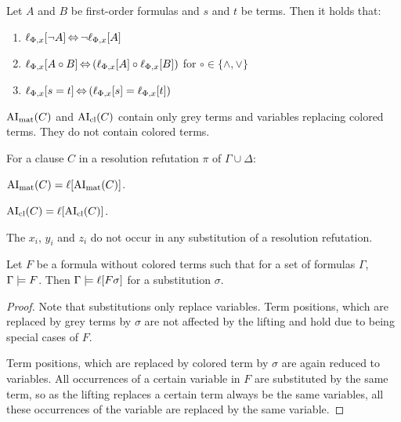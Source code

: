 \documentclass[,%
	paper=a4,%
	DIV15, 
	liststotoc,
	bibtotoc,
	draft=false,%
	numbers=noendperiod
]{scrartcl}
\begin{document}
\begin{lemma}
	\label{lemma:lift_logic_commute}
	Let $A$ and $B$ be first-order formulas and $s$ and $t$ be terms. Then it holds that:
	\begin{enumerate}
		\item $\lift{\Phi}{\lnot A}{x} \semiff{} \lnot \lift{\Phi}{A}{x}$
		\item $\lift{\Phi}{A \circ B}{x} \semiff{} ( \lift{\Phi}{A}{x} \circ \lift{\Phi}{B}{x} )$ for  $\circ \in     \{\land, \lor\}$
		\item $\lift{\Phi}{s = t}{x} \semiff{} ( \lift{\Phi}{s}{x} = \lift{\Phi}{t}{x} )$
	\end{enumerate}
\end{lemma}



\begin{lemma}
	$\AImatrix(C)$ and $\AIclause(C)$ contain only grey terms and variables replacing colored terms. They do not contain colored terms.
	\label{lemma:no_colored_terms}
\end{lemma}



\begin{corr}
  For a clause $C$ in a resolution refutation $\pi$ of $\Gamma \cup \Delta$:
  \begin{compactenum}
    \item $\AImatrix(C) = \lifboth{\AImatrix(C)}$.

    \item $\AIclause(C) = \lifboth{\AIclause(C)}$.
  \end{compactenum}
  \label{corr:lift_ai}
\end{corr}

\begin{lemma}
  The $x_i$, $y_i$ and $z_i$ do not occur in any substitution of a resolution refutation.
\end{lemma}

\begin{lemma}
	Let $F$ be a formula without colored terms such that for a set of formulas $\Gamma$, $\Gamma \entails F$.
	Then $\Gamma \entails \lifboth{F\sigma}$ for a substitution $\sigma$.
	\label{lemma:substitute_and_lift}
\end{lemma}
\begin{proof}
	Note that substitutions only replace variables. Term positions, which are replaced by grey terms by $\sigma$ are not affected by the lifting and hold due to being special cases of $F$.

	Term positions, which are replaced by colored term by $\sigma$ are again reduced to variables.
	All occurrences of a certain variable in $F$ are substituted by the same term, so as the lifting replaces a certain term always be the same variables, all these occurrences of the variable are replaced by the same variable.
\end{proof}
\end{document}
